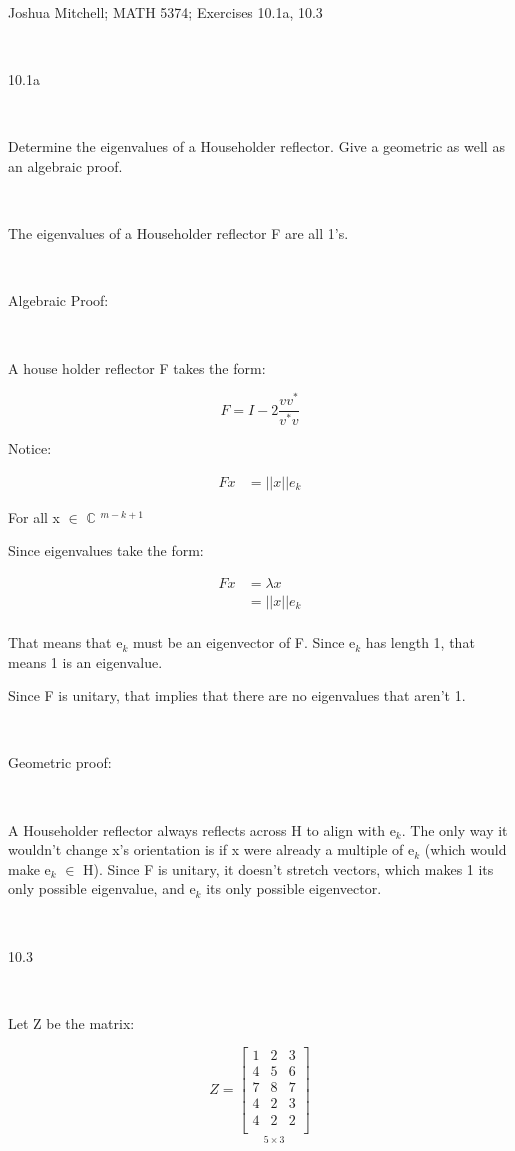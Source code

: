 \documentclass[12pt]{article}
\newcommand{\mt}[1]{\ensuremath{#1}}
\newcommand{\bc}{\mt{\mathbb{C}} }       %
\newcommand{\mem}{\mt{\in} }
\newcommand{\uw}[2]{#1\mt{_{#2}}}
\newcommand{\uf}[2]{#1\mt{^{#2}}}
\newcommand{\splt}[1]{\begin{split}#1\end{split}}
\begin{document}
Joshua Mitchell; MATH 5374; Exercises 10.1a, 10.3

\

10.1a

\

Determine the eigenvalues of a Householder reflector. Give a geometric as well as an algebraic proof.

\

The eigenvalues of a Householder reflector F are all 1's.

\

Algebraic Proof:

\

A house holder reflector F takes the form:

\begin{displaymath}
  F = I - 2\frac{vv^*}{v^*v}
\end{displaymath}

Notice:

\begin{displaymath}
\splt{
	Fx & = ||x||e_k
}
\end{displaymath}

For all x \mem \uf{\bc}{m - k + 1}

Since eigenvalues take the form:

\begin{displaymath}
\splt{
	Fx & = \lambda x \\
	& = ||x||e_k \\
}
\end{displaymath}

That means that \uw{e}{k} must be an eigenvector of F. Since \uw{e}{k} has length 1, that means 1 is an eigenvalue.

Since F is unitary, that implies that there are no eigenvalues that aren't 1.

\

Geometric proof:

\

A Householder reflector always reflects across H to align with \uw{e}{k}. The only way it wouldn't change x's orientation is if x were already a multiple of \uw{e}{k} (which would make \uw{e}{k} \mem H). Since F is unitary, it doesn't stretch vectors, which makes 1 its only possible eigenvalue, and \uw{e}{k} its only possible eigenvector.

\

10.3

\

Let Z be the matrix:

\begin{displaymath}
  Z = \underset{5 \times 3}{
\begin{bmatrix}
     1 &  2 & 3 \\
     4 & 5 & 6 \\
     7 & 8 & 7 \\
     4 & 2 & 3 \\
     4 & 2 & 2 \\
  \end{bmatrix}
}
\end{displaymath}
\end{document}
